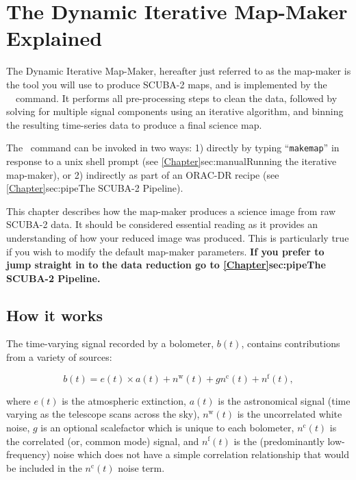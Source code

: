 \chapter{The Dynamic Iterative Map-Maker Explained}
\label{sec:dimm}

The Dynamic Iterative Map-Maker, hereafter just referred to as the
map-maker is the tool you will use to produce SCUBA-2 maps, and is
implemented by the \smurf\ \makemap\ command. It performs
all pre-processing steps to clean the data, followed by solving for
multiple signal components using an iterative algorithm, and binning
the resulting time-series data to produce a final science map.

The \makemap\ command can be invoked in two ways: 1) directly by typing
``\texttt{makemap}'' in response to a unix shell prompt (see
\cref{Chapter}{sec:manual}{Running the iterative map-maker}), or 2)
indirectly as part of an ORAC-DR recipe (see
\cref{Chapter}{sec:pipe}{The SCUBA-2 Pipeline}).

This chapter describes how the map-maker produces a science image
from raw SCUBA-2 data. It should be considered essential reading as it
provides an understanding of how your reduced image was produced. This is
particularly true if you wish to modify the default map-maker parameters.
\color{red}\textbf{ If you prefer to jump straight in to the data reduction go
to \cref{Chapter}{sec:pipe}{The SCUBA-2 Pipeline}.}\color{black}


\section{How it works}

The time-varying signal recorded by a bolometer, $b(t)$, contains
contributions from a variety of sources:

\begin{equation}
\label{eq:bolsig}
b(t) = e(t) \times a(t) + n^{\textrm{w}}(t) + gn^{\textrm{c}}(t) + n^{\textrm{f}}(t),
\end{equation}

where $e(t)$ is the atmospheric extinction, $a(t)$ is the astronomical
signal (time varying as the telescope scans across the sky),
$n^{\textrm{w}}(t)$ is the uncorrelated white noise, $g$ is an
optional scalefactor which is unique to each bolometer,
$n^{\textrm{c}}(t)$ is the correlated (or, common mode) signal, and
$n^{\textrm{f}}(t)$ is the (predominantly low-frequency) noise which
does not have a simple correlation relationship that would be included
in the $n^{\textrm{c}}(t)$ noise term.


